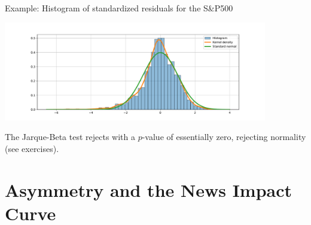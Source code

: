 \begin{frame}%

\begin{block}{Example: Histogram of standardized residuals for the S\&P500}
\centerline{\includegraphics[height=1.7in]{hist_resids}}
The Jarque-Beta test rejects with a $p$-value of essentially zero, rejecting normality (see exercises).
\end{block}

\end{frame}%


\section[Asymmetry]{Asymmetry and the News Impact Curve}\subsection*{}

